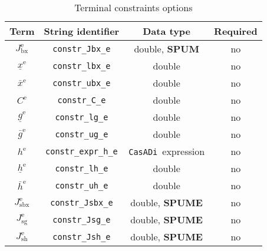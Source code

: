 \documentclass[english]{article}
\newcommand{\code}[1]{\texttt{#1}}
\newcommand{\casadi}{\texttt{CasADi}}
\newcommand{\ind}[1]{_{\textrm{#1}}}
\newcommand{\terminal}{^{\textrm{e}}}
\newcommand{\optional}{no}
\begin{document}
\begin{table}[ht!]
    \centering
    \caption{Terminal constraints options} \label{tab:constraints:terminal}
    \begin{tabular}{cccc}
        \toprule
        Term & String identifier & Data type & Required \\ \midrule
        $J\ind{bx}\terminal$ & \code{constr\_Jbx\_e}    & double, \textbf{SPUM}   & \optional   \\
        $\underline{x}\terminal $    & \code{constr\_lbx\_e}     & double  & \optional   \\
        $\bar{x}\terminal $         & \code{constr\_ubx\_e}     & double   & \optional  \\ [1em]
        $ C\terminal $ & \code{constr\_C\_e}    & double   & \optional   \\
        $\underline{g}\terminal $    & \code{constr\_lg\_e}     & double   & \optional   \\
        $\bar{g}\terminal $         & \code{constr\_ug\_e}     & double   & \optional  \\ [1em]
        $ h\terminal $ & \code{constr\_expr\_h\_e}    & \casadi~expression   & \optional  \\
        $\underline{h}\terminal $    & \code{constr\_lh\_e}     & double   & \optional   \\
        $\bar{h}\terminal $         & \code{constr\_uh\_e}     & double  & \optional   \\ [1em]
        $ J\ind{sbx}\terminal $ & \code{constr\_Jsbx\_e} & double, \textbf{SPUME}   & \optional \\
        $ J\ind{sg}\terminal $ & \code{constr\_Jsg\_e} & double, \textbf{SPUME} & \optional  \\
        $ J\ind{sh}\terminal $ & \code{constr\_Jsh\_e} & double, \textbf{SPUME}  & \optional  \\
        \bottomrule
    \end{tabular}
\end{table}
%
%
\end{document}
